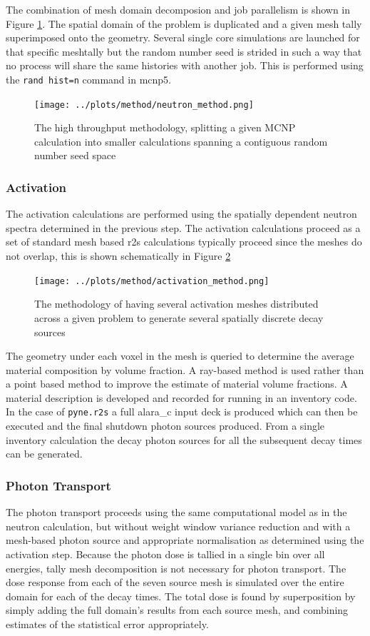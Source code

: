 \documentclass[12pt]{article}
\begin{document}
The combination of mesh domain decomposion and job parallelism is shown in
Figure \ref{fig:mesh_splitting}.  
The spatial domain of the problem is duplicated and a given
mesh tally superimposed onto the geometry. Several single core simulations are
launched for that specific meshtally but the random number seed is strided in
such a way that no process will share the same histories with another job.  
This is performed using the \texttt{rand hist=n} command in \gls{mcnp5}.

\begin{figure}[ht!]
  \centering
  \texttt{[image: ../plots/method/neutron\_method.png]}
  \caption{The high throughput methodology, splitting a given MCNP calculation
           into smaller calculations spanning a contiguous random number seed
           space}
  \label{fig:mesh_splitting}
\end{figure}


\subsubsection{Activation}
The activation calculations are performed using the spatially dependent neutron
spectra determined in the previous step. The activation calculations proceed as
a set of standard mesh based \gls{r2s} calculations typically proceed since the 
meshes do not overlap, this is shown schematically in Figure
\ref{fig:activation_method}
\begin{figure}[ht!]
  \centering
  \texttt{[image: ../plots/method/activation\_method.png]}
  \caption{The methodology of having several activation meshes distributed
           across a given problem to generate several spatially discrete
           decay sources}
  \label{fig:activation_method}
\end{figure}
The geometry under each voxel in the mesh is queried to 
determine the average material composition by volume fraction.  A ray-based
method is used rather than a point based method to improve the estimate of material
volume fractions.  A material 
description is developed and recorded for running in an inventory code. In the 
case of \texttt{pyne.r2s} a full \gls{alara_c} input deck is produced which can
then be executed and the final shutdown photon sources produced. From a single
inventory calculation the decay photon sources for all the subsequent decay
times can be generated.  

\subsubsection{Photon Transport}
The photon transport proceeds using the same computational model as in the
neutron calculation, but without weight window variance reduction and with a
mesh-based photon source and appropriate normalisation as determined using the
activation step.  Because the photon dose is tallied in a single bin over all
energies, tally mesh decomposition is not necessary for photon transport.  The
dose response from each of the seven source mesh is simulated over the entire
domain for each of the decay times.  The total dose is found by superposition
by simply adding the full domain's results from each source mesh, and
combining estimates of the statistical error appropriately.
\end{document}
